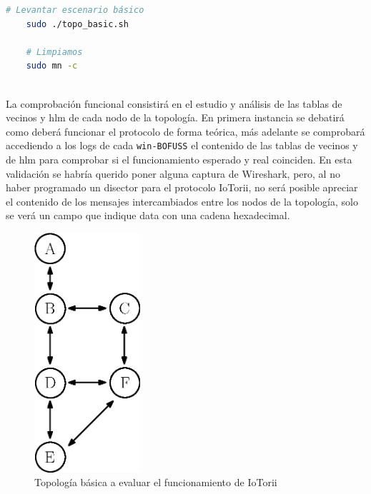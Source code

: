 \begin{lstlisting}[language= bash, style=Consola, caption={Puesta en marcha y limpieza del escenario},label=code:eva_scenario]
    # Levantar escenario básico
    sudo ./topo_basic.sh
    
    # Limpiamos
    sudo mn -c
    
\end{lstlisting}
\vspace{0.5cm}

La comprobación funcional consistirá en el estudio y análisis de las tablas de vecinos y \gls{hlm} de cada nodo de la topología. En primera instancia se debatirá como deberá funcionar el protocolo de forma teórica, más adelante se comprobará accediendo a los logs de cada \texttt{win-BOFUSS} el contenido de las tablas de vecinos y de \gls{hlm} para comprobar si el funcionamiento esperado y real coinciden. En esta validación se habría querido poner alguna captura de Wireshark, pero, al no haber programado un disector para el protocolo IoTorii, no será posible apreciar el contenido de los mensajes intercambiados entre los nodos de la topología, solo se verá un campo que indique data con una cadena hexadecimal.\\


\begin{figure}[ht]
    \centering
    \includegraphics[width=0.35\textwidth]{archivos/img/dev/topo_eva.eps}
    \caption{Topología básica a evaluar el funcionamiento de IoTorii}
    \label{fig:topo_eva}
\end{figure}

